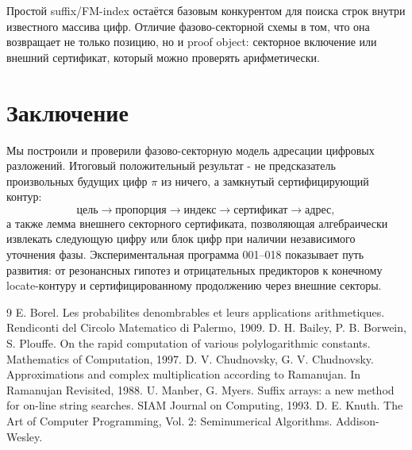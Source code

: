 \documentclass[11pt,a4paper]{article}
\begin{document}
Простой suffix/FM-index остаётся базовым конкурентом для поиска строк внутри известного массива цифр.  Отличие фазово-секторной схемы в том, что она возвращает не только позицию, но и proof object: секторное включение или внешний сертификат, который можно проверять арифметически.

\section{Заключение}

Мы построили и проверили фазово-секторную модель адресации цифровых разложений.  Итоговый положительный результат - не предсказатель произвольных будущих цифр $\pi$ из ничего, а замкнутый сертифицирующий контур:
\[
  \text{цель}\to\text{пропорция}\to\text{индекс}\to\text{сертификат}\to\text{адрес},
\]
а также лемма внешнего секторного сертификата, позволяющая алгебраически извлекать следующую цифру или блок цифр при наличии независимого уточнения фазы.  Экспериментальная программа 001--018 показывает путь развития: от резонансных гипотез и отрицательных предикторов к конечному locate-контуру и сертифицированному продолжению через внешние секторы.

\newpage
\begin{thebibliography}{9}
 E. Borel. Les probabilites denombrables et leurs applications arithmetiques. Rendiconti del Circolo Matematico di Palermo, 1909.
 D. H. Bailey, P. B. Borwein, S. Plouffe. On the rapid computation of various polylogarithmic constants. Mathematics of Computation, 1997.
 D. V. Chudnovsky, G. V. Chudnovsky. Approximations and complex multiplication according to Ramanujan. In Ramanujan Revisited, 1988.
 U. Manber, G. Myers. Suffix arrays: a new method for on-line string searches. SIAM Journal on Computing, 1993.
 D. E. Knuth. The Art of Computer Programming, Vol. 2: Seminumerical Algorithms. Addison-Wesley.
\end{thebibliography}
\end{document}
